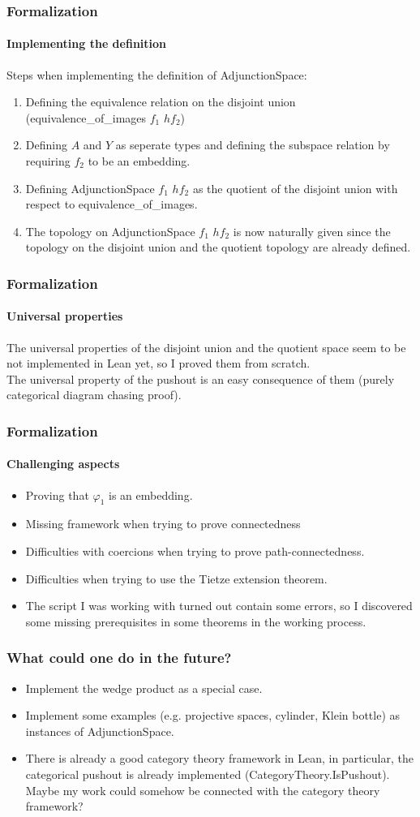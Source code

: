 \documentclass{beamer}
\begin{document}
	\begin{frame}
		\frametitle{Formalization}
		\framesubtitle{Implementing the definition}
		Steps when implementing the definition of AdjunctionSpace:
		\begin{enumerate}
			\item<2-5> Defining the equivalence relation on the disjoint union (equivalence\_of\_images $f_1$ $hf_2$)
			\item<3-5> Defining $A$ and $Y$ as seperate types and defining the subspace relation by requiring $f_2$ to be an embedding.
			\item<4-5> Defining AdjunctionSpace $f_1$ $hf_2$ as the quotient of the disjoint union with respect to equivalence\_of\_images.
			\item<5> The topology on AdjunctionSpace $f_1$ $hf_2$ is now naturally given since the topology on the disjoint union and the quotient topology are already defined.
		\end{enumerate}
	\end{frame}
	\begin{frame}
		\frametitle{Formalization}
		\framesubtitle{Universal properties}
		The universal properties of the disjoint union and the quotient space seem to be not implemented in Lean yet, so I proved them from scratch. \pause[2]
		\\The universal property of the pushout is an easy consequence of them (purely categorical diagram chasing proof).
	\end{frame}
	\begin{frame}
		\frametitle{Formalization}
		\framesubtitle{Challenging aspects}
		\begin{itemize}
			\item<1-5> Proving that $\varphi_1$ is an embedding.
			\item<2-5> Missing framework when trying to prove connectedness
			\item<3-5> Difficulties with coercions when trying to prove path-connectedness.
			\item<4-5> Difficulties when trying to use the Tietze extension theorem.
			\item<5> The script I was working with turned out contain some errors, so I discovered some missing prerequisites in some theorems in the working process.
		\end{itemize}
	\end{frame}
	\begin{frame}
		\frametitle{What could one do in the future?}
		\begin{itemize}
			\item<1-3> Implement the wedge product as a special case.
			\item<2-3> Implement some examples (e.g. projective spaces, cylinder, Klein bottle) as instances of AdjunctionSpace.
			\item<3> There is already a good category theory framework in Lean, in particular, the categorical pushout is already implemented (CategoryTheory.IsPushout). Maybe my work could somehow be connected with the category theory framework?
		\end{itemize}
	\end{frame}
\end{document}
